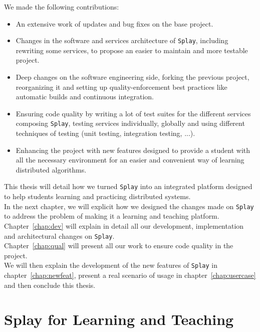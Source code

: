 \documentclass{eplmastersthesis}
\begin{document}
      We made the following contributions:

      \begin{itemize}
        \item An extensive work of updates and bug fixes on the base project.
        \item Changes in the software and services architecture of \texttt{Splay},
        including rewriting some services, to propose an easier to maintain and
        more testable project.
        \item Deep changes on the software engineering side, forking the
        previous project, reorganizing it and setting up quality-enforcement
        best practices like automatic builds and continuous integration.
        \item Ensuring code quality by writing a lot of test suites for the
        different services composing \texttt{Splay}, testing services individually,
        globally and using different techniques of testing (unit testing,
        integration testing, ...).
        \item Enhancing the project with new features designed to provide a
        student with all the necessary environment for an easier and convenient
        way of learning distributed algorithms.
      \end{itemize}

      This thesis will detail how we turned \texttt{Splay} into an integrated
      platform designed to help students learning and practicing distributed
      systems.\\
      In the next chapter, we will explicit how we designed the changes made on
      \texttt{Splay} to address the problem of making it a learning and teaching
      platform.\\
      Chapter~\ref{chap:dev} will explain in detail all our development,
      implementation and architectural changes on \texttt{Splay}.\\
      Chapter~\ref{chap:qual} will present all our work to ensure code quality
      in the project.\\
      We will then explain the development of the new features
      of \texttt{Splay} in chapter~\ref{chap:newfeat}, present a real scenario
      of usage in chapter~\ref{chap:usercase} and then conclude this thesis.

  \chapter{Splay for Learning and Teaching}
  \label{chap:splayteaching}
\end{document}
